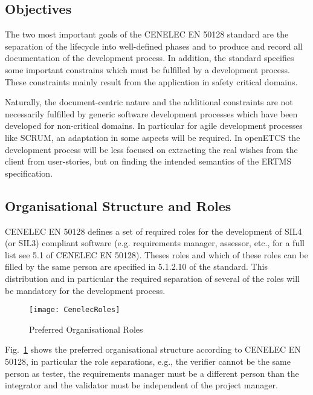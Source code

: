 
\subsection{Objectives}
\label{sec:objectives}

The two most important goals of the CENELEC EN 50128 standard are the separation
of the lifecycle into well-defined phases and to produce and record all
documentation of the development process. In addition, the standard specifies
some important constrains which must be fulfilled by a development
process. These constraints mainly result from the application in safety critical
domains.

Naturally, the document-centric nature and the additional constraints are not
necessarily fulfilled by generic software development processes which have been
developed for non-critical domains. In particular for agile development
processes like SCRUM, an adaptation in some aspects will be
required. In openETCS the development process will be less  focused on
extracting the real wishes from the client from user-stories, but on finding the
intended semantics of the ERTMS specification.

\subsection{Organisational Structure and Roles}
\label{sec:organ-struct-roles}

CENELEC EN 50128 defines a set of required roles for the development of SIL4 (or
SIL3) compliant software (e.g. requirements manager, assessor, etc., for a full
list see 5.1 of CENELEC EN 50128). Theses roles and which of these roles can be
filled by the same person are specified in 5.1.2.10 of the standard. This
distribution and in particular the required separation of several of the roles
will be mandatory for the development process.

\begin{figure}[ht]
  \centering
  \texttt{[image: CenelecRoles]}
  \caption{Preferred Organisational Roles}
  \label{fig:preferred-roles}
\end{figure}

Fig.~\ref{fig:preferred-roles} shows the preferred organisational structure
according to CENELEC EN 50128, in particular  the role separations,
e.g., the verifier cannot be the same person as tester, the requirements
manager must be a different person than the integrator and the validator must be
independent of the project manager.

